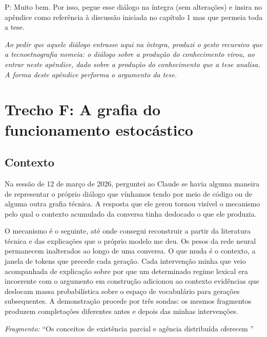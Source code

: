 \begin{faladaP}
P: Muito bem. Por isso, pegue esse diálogo na íntegra (sem alterações) e insira no apêndice como referência à discussão iniciada no capítulo 1 mas que permeia toda a tese.
\end{faladaP}

\noindent\emph{Ao pedir que aquele diálogo entrasse aqui na íntegra, produzi o gesto recursivo que a tecnoetnografia nomeia: o diálogo sobre a produção do conhecimento virou, ao entrar neste apêndice, dado sobre a produção do conhecimento que a tese analisa. A forma deste apêndice performa o argumento da tese.}

\par{}

\section*{Trecho F: A grafia do funcionamento estocástico}

\subsection*{Contexto}

Na sessão de 12 de março de 2026, perguntei ao Claude se havia alguma maneira de representar o próprio diálogo que vínhamos tendo por meio de código ou de alguma outra grafia técnica. A resposta que ele gerou tornou visível o mecanismo pelo qual o contexto acumulado da conversa tinha deslocado o que ele produzia.

O mecanismo é o seguinte, até onde consegui reconstruir a partir da literatura técnica e das explicações que o próprio modelo me deu. Os pesos da rede neural permanecem inalterados ao longo de uma conversa. O que muda é o contexto, a janela de tokens que precede cada geração. Cada intervenção minha que veio acompanhada de explicação sobre por que um determinado regime lexical era incoerente com o argumento em construção adicionou ao contexto evidências que deslocam massa probabilística sobre o espaço de vocabulário para gerações subsequentes. A demonstração procede por três sondas: os mesmos fragmentos produzem completações diferentes antes e depois das minhas intervenções.

\noindent\textit{Fragmento:} ``Os conceitos de existência parcial e agência distribuída oferecem \underline{\hspace{2cm}}''

